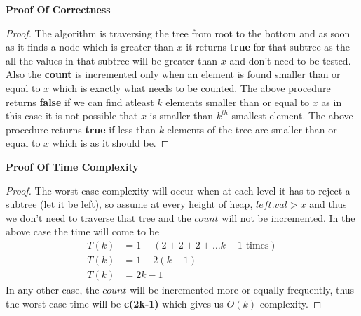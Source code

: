 \documentclass{article}
\let\bold\textbf
\begin{document}
{  \newline \bold{Proof Of Correctness}
  \begin{proof}
    The algorithm is traversing the tree from root to the bottom and as soon as it finds a node which is greater than $x$ it returns \bold{true} for that subtree as the all the values in that subtree will be greater than $x$ and don't need to be tested. \newline
    Also the \bold{count} is incremented only when an element is found smaller than or equal to $x$ which is exactly what needs to be counted. \newline
    The above procedure returns \bold{false} if we can find atleast $k$ elements smaller than or equal to $x$ as in this case it is not possible that $x$ is smaller than $k^{th}$ smallest element.\newline
    The above procedure returns \bold{true} if less than $k$ elements of the tree are smaller than or equal to $x$ which is as it should be.
  \end{proof}
  \newpage
  \noindent\bold{Proof Of Time Complexity}
  \begin{proof}
    The worst case complexity will occur when at each level it has to reject a subtree (let it be left), so assume at every height of heap, $left.val > x$ and thus we don't need to traverse that tree and the $count$ will not be incremented. \newline
    In the above case the time will come to be
    \begin{align*}
      T(k) &= 1 + (2 + 2 + 2 + \dots k-1\text{ times}) \\
      T(k) &= 1 + 2(k-1) \\
      T(k) &= 2k-1
    \end{align*}
    In any other case, the $count$ will be incremented more or equally frequently, thus the worst case time will be \bold{c(2k-1)} which gives us $O(k)$ complexity.
  \end{proof}
}
\newpage
\end{document}
